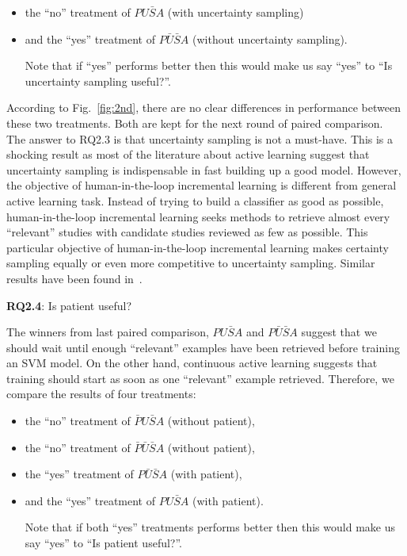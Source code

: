 \documentclass{svjour3}
\theoremstyle{break}
\begin{document}
\begin{itemize}
\item the ``no'' treatment of $PU\bar{S}A$ (with uncertainty sampling)
\item and the ``yes'' treatment of $P\bar{U}\bar{S}A$ (without uncertainty sampling). 

Note that if ``yes''
performs better then this would make us say ``yes'' to ``Is uncertainty sampling useful?''.
\end{itemize}

According to Fig.~\ref{fig:2nd}, there are no clear differences in performance between these two treatments. Both are kept for the next round of paired comparison. The answer to RQ2.3 is that uncertainty sampling is not a must-have. This is a shocking result as most of the literature about active learning suggest that uncertainty sampling is indispensable in fast building up a good model. However, the objective of human-in-the-loop incremental learning is different from general active learning task. Instead of trying to build a classifier as good as possible, human-in-the-loop incremental learning seeks methods to retrieve almost every ``relevant'' studies with candidate studies reviewed as few as possible. This particular objective of human-in-the-loop incremental learning makes certainty sampling equally or even more competitive to uncertainty sampling. Similar results have been found in~\cite{cormack2014evaluation}.

\textbf{RQ2.4}: Is patient useful?

The winners from last paired comparison, $PU\bar{S}A$ and $P\bar{U}\bar{S}A$ suggest that we should wait until enough ``relevant'' examples have been retrieved before training an SVM model. On the other hand, continuous active learning suggests that training should start as soon as
one ``relevant'' example retrieved. Therefore, we compare the results of four treatments:

\begin{itemize}
\item the ``no'' treatment of $\bar{P}U\bar{S}A$ (without patient),
\item the ``no'' treatment of $\bar{P}\bar{U}\bar{S}A$ (without patient),
\item the ``yes'' treatment of $P\bar{U}\bar{S}A$ (with patient), 
\item and the ``yes'' treatment of $PU\bar{S}A$ (with patient). 

Note that if both ``yes'' treatments performs better then this would make us say ``yes'' to ``Is patient useful?''.
\end{itemize}
\end{document}
